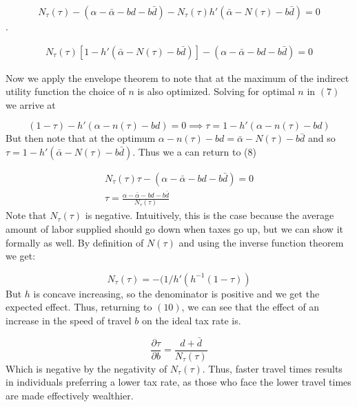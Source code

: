 \documentclass[11.0pt]{article}
\theoremstyle{definition}
\newcommand{\pderiv}[2]{\frac{\partial #1}{\partial #2}}
\begin{document}
$$N_\tau(\tau) - (\alpha - \bar{\alpha}-bd-b\bar{d}) - N_\tau(\tau)h'(\bar{\alpha}-N(\tau)-b\bar{d}) = 0$$.

\begin{eqnarray}
N_\tau(\tau)[1- h'(\bar{\alpha}-N(\tau)-b\bar{d})]- (\alpha - \bar{\alpha}-bd-b\bar{d})  = 0
\end{eqnarray}

Now we apply the envelope theorem to note that at the maximum of the indirect utility function the choice of $n$ is also optimized.  Solving for optimal $n$ in $(7)$ we arrive at 

$$ (1-\tau)   - h'(\alpha - n(\tau) - bd) = 0 \implies \tau = 1- h'(\alpha - n(\tau) - bd)$$
But then note that at the optimum $\alpha - n(\tau) - bd = \bar{\alpha} - N(\tau) - b \bar{d}$ and so  $\tau = 1 - h'(\bar{\alpha} - N(\tau) - b \bar{d})$.  Thus we a can return to (8)

\begin{eqnarray}
N_\tau(\tau)\tau - (\alpha - \bar{\alpha}-bd-b\bar{d})  = 0 \\
\tau = \frac{\alpha - \bar{\alpha}-bd-b\bar{d}}{N_\tau(\tau)}
\end{eqnarray}
Note that $N_\tau(\tau)$ is negative. Intuitively, this is the case because the average amount of labor supplied should go down when taxes go up, but we can show it formally as well. By definition of $N(\tau)$ and using the inverse function theorem we get:

$$N_\tau(\tau) = -(1/h'(h^{-1}(1-\tau))$$
But $h$ is concave increasing, so the denominator is positive  and we get the expected effect.  Thus, returning to $(10)$, we can see that the effect of an increase in the speed of travel $b$ on the ideal tax rate is.

$$\pderiv{\tau}{b} = \frac{d+\bar{d}}{N_\tau(\tau)}$$
Which is negative by the negativity of $N_\tau(\tau)$.  Thus, faster travel times results in individuals preferring a lower tax rate, as those who face the lower travel times are made effectively wealthier. 

%
%
%
\end{document}
